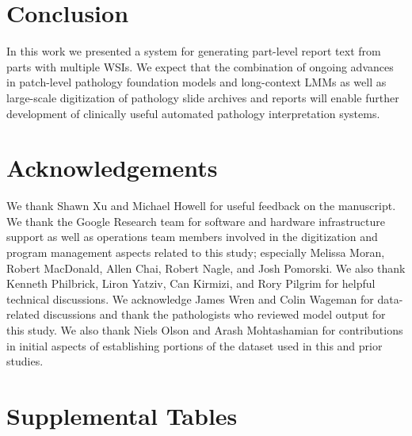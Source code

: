 \documentclass[11pt]{article}
\begin{document}
\section{Conclusion}
\label{sec:conclusion}
In this work we presented a system for generating part-level report text from parts with multiple WSIs. We expect that the combination of ongoing advances in patch-level pathology foundation models and long-context LMMs as well as large-scale digitization of pathology slide archives and reports will enable further development of clinically useful automated pathology interpretation systems.

\section*{Acknowledgements}
We thank Shawn Xu and Michael Howell for useful feedback on the manuscript. We thank the Google Research team for software and hardware infrastructure support as well as operations team members involved in the digitization and program management aspects related to this study; especially Melissa Moran, Robert MacDonald, Allen Chai, Robert Nagle, and Josh Pomorski. We also thank Kenneth Philbrick, Liron Yatziv, Can Kirmizi, and Rory Pilgrim for helpful technical discussions. We acknowledge James Wren and Colin Wageman for data-related discussions and thank the pathologists who reviewed model output for this study. We also thank Niels Olson and Arash Mohtashamian for contributions in initial aspects of establishing portions of the dataset used in this and prior studies.




\newpage
\appendix

\renewcommand\thefigure{\thesection.\arabic{figure}}    
\setcounter{figure}{0}    

\renewcommand\thetable{\thesection.\arabic{table}}
\setcounter{table}{0}

\section{Supplemental Tables}
\end{document}

